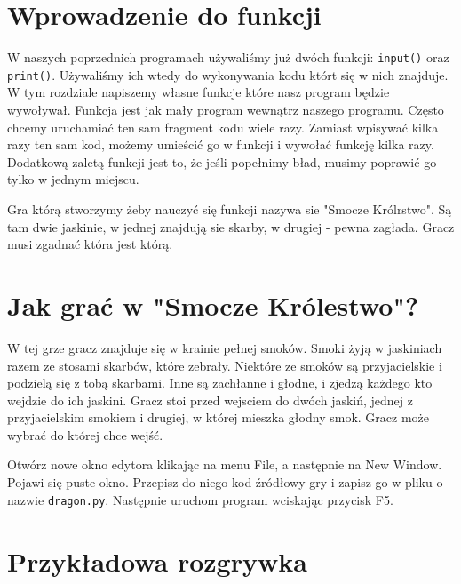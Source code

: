 \documentclass{book}
\begin{document}
\section{Wprowadzenie do funkcji}

W naszych poprzednich programach używaliśmy już dwóch funkcji: \lstinline{input()} oraz \lstinline{print()}. Używaliśmy ich wtedy do wykonywania kodu którt się w nich znajduje. W tym rozdziale napiszemy własne funkcje które nasz program będzie wywoływał. Funkcja jest jak mały program wewnątrz naszego programu. Często chcemy uruchamiać ten sam fragment kodu wiele razy. Zamiast wpisywać kilka razy ten sam kod, możemy umieścić go w funkcji i wywołać funkcję kilka razy. Dodatkową zaletą funkcji jest to, że jeśli popełnimy bład, musimy poprawić go tylko w jednym miejscu. 

Gra którą stworzymy żeby nauczyć się funkcji nazywa sie "Smocze Królrstwo". Są tam dwie jaskinie, w jednej znajdują sie skarby, w drugiej - pewna zagłada. Gracz musi zgadnać która jest którą.

\section{Jak grać w "Smocze Królestwo"?}

W tej grze gracz znajduje się w krainie pełnej smoków. Smoki żyją w jaskiniach razem ze stosami skarbów, które zebrały. Niektóre ze smoków są przyjacielskie i podzielą się z tobą skarbami. Inne są zachłanne i głodne, i zjedzą każdego kto wejdzie do ich jaskini. Gracz stoi przed wejsciem do dwóch jaskiń, jednej z przyjacielskim smokiem i drugiej, w której mieszka głodny smok. Gracz może wybrać do której chce wejść.

Otwórz nowe okno edytora klikając na menu File, a następnie na New Window. Pojawi się puste okno. Przepisz do niego kod źródłowy gry i zapisz go w pliku o nazwie \lstinline{dragon.py}. Następnie uruchom program wciskając przycisk F5.

\section{Przykładowa rozgrywka}
\end{document}
